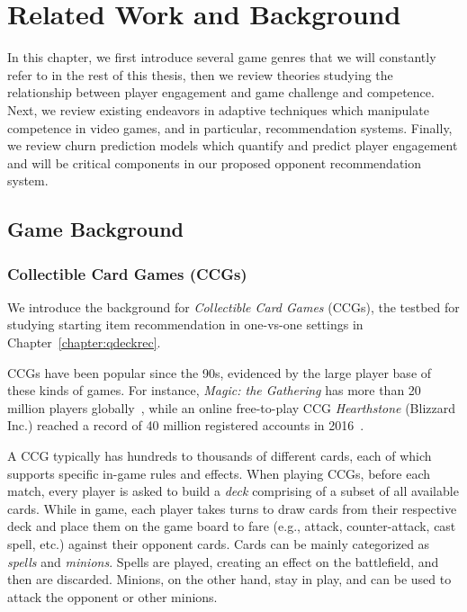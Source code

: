 \chapter{Related Work and Background} %

\label{chapter:relatework} 

In this chapter, we first introduce several game genres that we will constantly refer to in the rest of this thesis, then we review theories studying the relationship between player engagement and game challenge and competence. Next, we review existing endeavors in adaptive techniques which manipulate competence in video games, and in particular, recommendation systems. Finally, we review churn prediction models which quantify and predict player engagement and will be critical components in our proposed opponent recommendation system.

\section{Game Background}

\subsection{Collectible Card Games (CCGs)}\label{sec:background_ccg}
 We introduce the background for \textit{Collectible Card Games} (CCGs), the testbed for studying starting item recommendation in one-vs-one settings in Chapter~\ref{chapter:qdeckrec}.
 
CCGs have been popular since the 90s, evidenced by the large player base of these kinds of games. For instance, \textit{Magic: the Gathering} has more than 20 million players globally~\cite{guinnessmagic}, while an online free-to-play CCG \textit{Hearthstone} (Blizzard Inc.) reached a record of 40 million registered accounts in 2016~\cite{hearthstonepopular}.  

A CCG typically has hundreds to thousands of different cards, each of which supports specific in-game rules and effects. When playing CCGs, before each match, every player is asked to build a \textit{deck} comprising of a subset of all available cards. While in game, each player takes turns to draw cards from their respective deck and place them on the game board to fare (e.g., attack, counter-attack, cast spell, etc.) against their opponent cards. Cards can be mainly categorized as \textit{spells} and \textit{minions}. Spells are played, creating an effect on the battlefield, and then are discarded. Minions, on the other hand, stay in play, and can be used to attack the opponent or other minions. 


